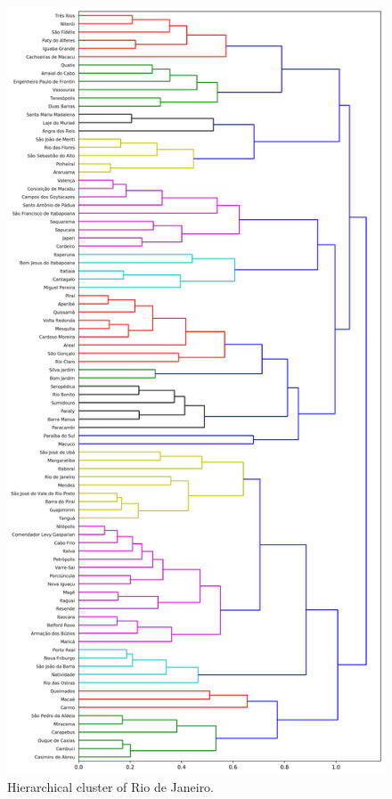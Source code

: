 \documentclass[12pt]{report}
\begin{document}
\begin{figure}[h!]
 \centering
 \includegraphics[height=\textheight]{clusterRJ_06.png}
 \caption{Hierarchical cluster of Rio de Janeiro.}
 \label{fig:cluster_rj}
\end{figure}
\end{document}
